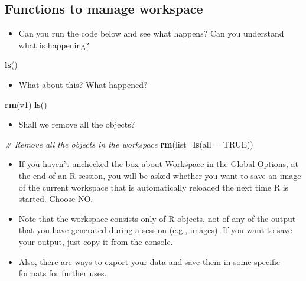 \documentclass[
]{book}
\newenvironment{Shaded}{\begin{snugshade}}{\end{snugshade}}
\newcommand{\AttributeTok}[1]{\textcolor[rgb]{0.13,0.29,0.53}{#1}}
\newcommand{\CommentTok}[1]{\textcolor[rgb]{0.56,0.35,0.01}{\textit{#1}}}
\newcommand{\ConstantTok}[1]{\textcolor[rgb]{0.56,0.35,0.01}{#1}}
\newcommand{\FunctionTok}[1]{\textcolor[rgb]{0.13,0.29,0.53}{\textbf{#1}}}
\newcommand{\NormalTok}[1]{#1}
\providecommand{\tightlist}{%
  \setlength{\itemsep}{0pt}\setlength{\parskip}{0pt}}
\begin{document}
\subsection{Functions to manage workspace}\label{functions-to-manage-workspace}

\begin{itemize}
\tightlist
\item
  Can you run the code below and see what happens? Can you understand what is happening?
\end{itemize}

\begin{Shaded}
\begin{Highlighting}[]
\FunctionTok{ls}\NormalTok{()}
\end{Highlighting}
\end{Shaded}

\begin{itemize}
\tightlist
\item
  What about this? What happened?
\end{itemize}

\begin{Shaded}
\begin{Highlighting}[]
\FunctionTok{rm}\NormalTok{(v1)}
\FunctionTok{ls}\NormalTok{()}
\end{Highlighting}
\end{Shaded}

\begin{itemize}
\tightlist
\item
  Shall we remove all the objects?
\end{itemize}

\begin{Shaded}
\begin{Highlighting}[]
\CommentTok{\# Remove all the objects in the workspace}
\FunctionTok{rm}\NormalTok{(}\AttributeTok{list=}\FunctionTok{ls}\NormalTok{(}\AttributeTok{all =} \ConstantTok{TRUE}\NormalTok{))}
\end{Highlighting}
\end{Shaded}

\begin{itemize}
\tightlist
\item
  If you haven't unchecked the box about Workspace in the Global Options, at the end of an R session, you will be asked whether you want to save an image of the current workspace that is automatically reloaded the next time R is started. Choose NO.
\item
  Note that the workspace consists only of R objects, not of any of the output that you have generated during a session (e.g., images). If you want to save your output, just copy it from the console.
\item
  Also, there are ways to export your data and save them in some specific formats for further uses.
\end{itemize}
\end{document}
